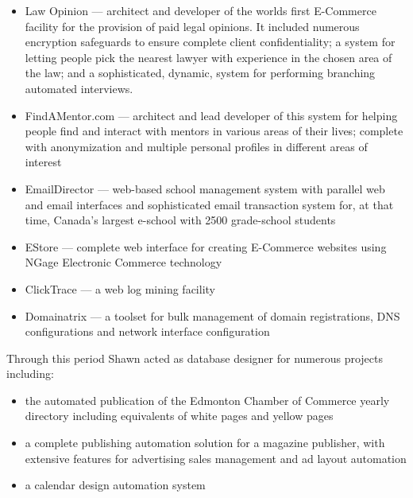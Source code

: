 \begin{resume}
\begin{position}
\begin{itemize}
\item Law Opinion --- architect and developer of the worlds
                        first E-Commerce facility for the provision of 
                        paid legal opinions.  
                        It included numerous encryption safeguards 
                        to ensure complete client confidentiality; a
                        system for letting people pick the nearest
                        lawyer with experience in the chosen area of
                        the law;  and a sophisticated, dynamic,
                        system for performing branching automated interviews.
\item FindAMentor.com --- architect and lead developer of this system
                    for helping people find and interact with mentors in
		    various areas of their lives; complete with anonymization and
		    multiple personal profiles in different areas of interest
\item EmailDirector --- web-based school management system with
                        parallel web and email interfaces
                        and sophisticated email transaction system for,
                        at that time, Canada's largest e-school
                        with 2500 grade-school students
\item EStore --- complete web interface for creating E-Commerce
                 websites using NGage Electronic Commerce technology
\item ClickTrace --- a web log mining facility
\item Domainatrix --- a toolset for bulk management of domain registrations, 
                      DNS configurations and network interface
                      configuration
\end{itemize}

Through this period Shawn acted as database designer for numerous projects including:
\begin{itemize}
\item the automated publication of the Edmonton Chamber of Commerce
  yearly directory including equivalents of white pages and yellow pages
\item a complete publishing automation solution for a magazine publisher, 
  with extensive features for advertising sales management and ad layout automation
\item a calendar design automation system


\end{itemize}


\end{position}
\end{resume}
